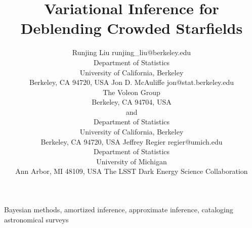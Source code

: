 \documentclass[twoside,11pt]{article}
\begin{document}
\title{Variational Inference for Deblending Crowded Starfields}

\author{\name Runjing Liu
    \email runjing\_liu@berkeley.edu \\
    \addr Department of Statistics\\
    University of California, Berkeley\\
    Berkeley, CA 94720, USA
    \AND
    \name Jon D. McAuliffe
    \email jon@stat.berkeley.edu \\
    \addr
    The Voleon Group \\
    Berkeley, CA 94704, USA \\
    and\\
    Department of Statistics\\
    University of California, Berkeley\\
    Berkeley, CA 94720, USA
    \AND
    \name Jeffrey Regier
    \email regier@umich.edu \\
    \addr
    Department of Statistics \\
    University of Michigan \\
    Ann Arbor, MI 48109, USA
    \AND
    \name The LSST Dark Energy Science Collaboration
    }


\maketitle

\begin{abstract}%

\end{abstract}

\begin{keywords}
  Bayesian methods, amortized inference, approximate inference, cataloging astronomical surveys
\end{keywords}












\acks{}

\end{document}
